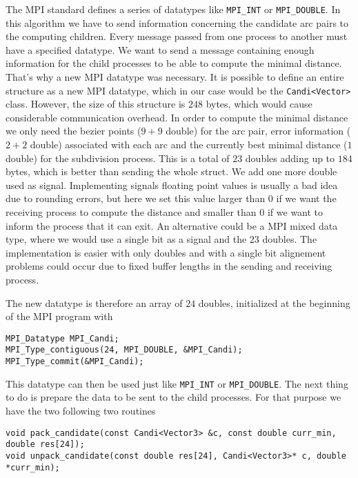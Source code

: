 \documentclass{article}
\begin{document}
The MPI standard defines a series of datatypes like \verb+MPI_INT+ or
\verb+MPI_DOUBLE+. In this algorithm we have to send information concerning
the candidate arc pairs to the computing children. Every message passed from one
process to another must have a specified datatype. We want to send a message
containing enough information for the child processes to be able to compute the
minimal distance. That's why a new MPI datatype was necessary. It is possible
to define an entire structure as a new MPI datatype, which in our case would be
the \verb+Candi<Vector>+ class. However, the size of this structure is $248$ bytes,
which would cause considerable communication overhead. In order to compute the
minimal distance we only need the bezier points ($9+9$ double) for the arc pair,
error information ($2+2$ double) associated with each arc and the currently best
minimal distance ($1$ double) for the subdivision process. This is a total of $23$
doubles adding up to $184$ bytes, which is better than sending the whole struct.
We add one more double used as signal. Implementing signals floating point values
is usually a bad idea due to rounding errors, but here we set this value larger
than $0$ if we want the receiving process to compute the distance and smaller than
$0$ if we want to inform the process that it can exit. An alternative could be a
MPI mixed data type, where we would use a single bit as a signal and the $23$ doubles.
The implementation is easier with only doubles and with a single bit alignement
problems could occur due to fixed buffer lengths in the sending and receiving process.

The new datatype is therefore an array of $24$ doubles, initialized at the beginning
of the MPI program with

\begin{verbatim}
MPI_Datatype MPI_Candi;
MPI_Type_contiguous(24, MPI_DOUBLE, &MPI_Candi);
MPI_Type_commit(&MPI_Candi);
\end{verbatim}

This datatype can then be used just like \verb+MPI_INT+ or \verb+MPI_DOUBLE+.
The next thing to do is prepare the data to be sent to the child processes.
For that purpose we have the two following two routines

\begin{verbatim}
void pack_candidate(const Candi<Vector3> &c, const double curr_min, double res[24]);
void unpack_candidate(const double res[24], Candi<Vector3>* c, double *curr_min);
\end{verbatim}
\end{document}

